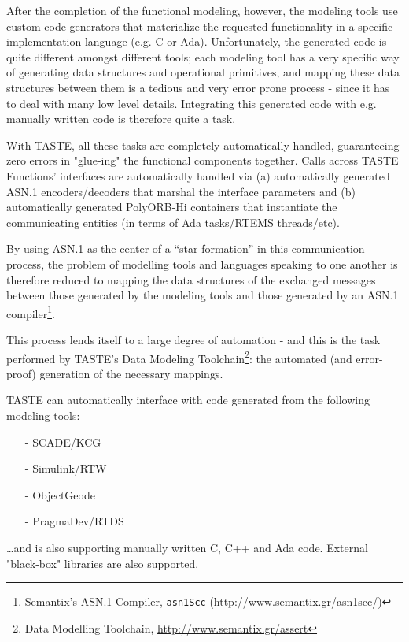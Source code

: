 \documentclass[11pt]{book}
\begin{document}
After the completion of the functional modeling, however, the modeling tools use
custom code generators that materialize the requested functionality in a 
specific implementation language (e.g. C or Ada).  Unfortunately, the generated code is 
quite different amongst different tools; each modeling tool has a very specific way
of generating data structures and operational primitives, and mapping these data structures 
between them is a tedious and very
error prone process - since it has to deal with many low level details.
Integrating this generated code with e.g. manually written code is therefore quite a task.

With TASTE, all these tasks are completely automatically handled, guaranteeing zero errors 
in "glue-ing" the functional components together.
Calls across TASTE Functions' interfaces are automatically handled via (a) automatically 
generated ASN.1 encoders/decoders that marshal the interface parameters and (b) automatically
generated PolyORB-Hi containers that instantiate the communicating entities (in terms
of Ada tasks/RTEMS threads/etc). 

By using ASN.1 as the center of a ``star formation'' in this communication process,
the problem of modelling tools and languages speaking to one another is therefore reduced to 
mapping the data structures of the exchanged messages 
between those generated by the modeling tools and those generated by an ASN.1 compiler\footnote{Semantix's ASN.1 Compiler, {\tt asn1Scc} (\url{http://www.semantix.gr/asn1scc/})}. 

This process lends itself to a large degree of automation - and this is the task performed by
TASTE's Data Modeling Toolchain\footnote{Data Modelling Toolchain, \url{http://www.semantix.gr/assert}}: the 
automated (and error-proof) generation of the necessary mappings.

   TASTE can automatically interface with code generated from the following modeling tools:
   \begin{itemize}
      \item[-]
         SCADE/KCG
      \item[-]
         Simulink/RTW
      \item[-]
         ObjectGeode
      \item[-]
         PragmaDev/RTDS
   \end{itemize}
\ldots and is also supporting manually written C, C++ and Ada code. External "black-box" libraries
are also supported.
\end{document}
